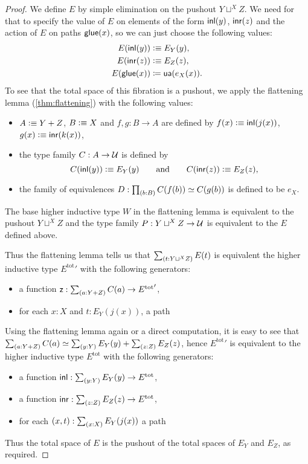 \begin{proof}
  We define $E$ by simple elimination on the pushout $Y\sqcup^XZ$. We need for
  that to specify the value of $E$ on elements of the form ${\mathsf{inl}}(y)$, ${\mathsf{inr}}(z)$
  and the action of $E$ on paths $\mathsf{glue}(x)$, so we can just choose the following
  values:
  \begin{align*}
    E({\mathsf{inl}}(y)) & \vcentcolon\equiv E_Y(y),\\
    E({\mathsf{inr}}(z)) & \vcentcolon\equiv E_Z(z),\\
    {E}\mathopen{}\left({\mathsf{glue}(x)}\right)\mathclose{} & \coloneqq \mathsf{ua}(e_X(x)).
  \end{align*}
  To see that the total space of this fibration is a pushout, we apply the
  flattening lemma (\autoref{thm:flattening}) with the following values:
  \begin{itemize}
  \item $A\vcentcolon\equiv Y+Z$, $B\vcentcolon\equiv X$ and $f,g:B\to A$ are defined by
    $f(x)\vcentcolon\equiv{\mathsf{inl}}(j(x))$, $g(x)\vcentcolon\equiv{\mathsf{inr}}(k(x))$,
  \item the type family $C:A\to\mathcal{U}$ is defined by
    \begin{equation*}
      C({\mathsf{inl}}(y)) \vcentcolon\equiv E_Y(y)
      \qquad\text{and}\qquad
      C({\mathsf{inr}}(z)) \vcentcolon\equiv E_Z(z),
    \end{equation*}
  \item the family of equivalences $D:\prd{b:B}C(f(b))\eqvsym C(g(b))$ is defined
    to be $e_X$.
  \end{itemize}
  The base higher inductive type $W$ in the flattening lemma is equivalent to
  the pushout $Y\sqcup^XZ$ and the type family $P:Y\sqcup^XZ\to\mathcal{U}$ is
  equivalent to the $E$ defined above.

  Thus the flattening lemma tells us that $\sm{t:Y\sqcup^XZ}E(t)$ is equivalent
  the higher inductive type ${E^{\mathrm{tot}}}'$ with the following generators:
  \begin{itemize}
  \item a function $\mathsf{z}:\sm{a:Y+Z}C(a)\to {E^{\mathrm{tot}}}'$,
  \item for each $x:X$ and $t:E_Y(j(x))$, a path
  \end{itemize}
  Using the flattening lemma again or a direct computation, it is easy to see
  that $\eqv{\sm{a:Y+Z}C(a)}{\sm{y:Y}E_Y(y)+\sm{z:Z}E_Z(z)}$, hence
  ${E^{\mathrm{tot}}}'$ is equivalent to the higher inductive type
  $E^{\mathrm{tot}}$ with the following generators:
  \begin{itemize}
  \item a function $\inl:\sm{y:Y}E_Y(y)\to E^{\mathrm{tot}}$,
  \item a function $\inr:\sm{z:Z}E_Z(z)\to E^{\mathrm{tot}}$,
  \item for each $(x,t):\sm{x:X}E_Y(j(x))$ a path
  \end{itemize}
  Thus the total space of $E$ is the pushout of the total spaces of
  $E_Y$ and $E_Z$, as required.
\end{proof}

